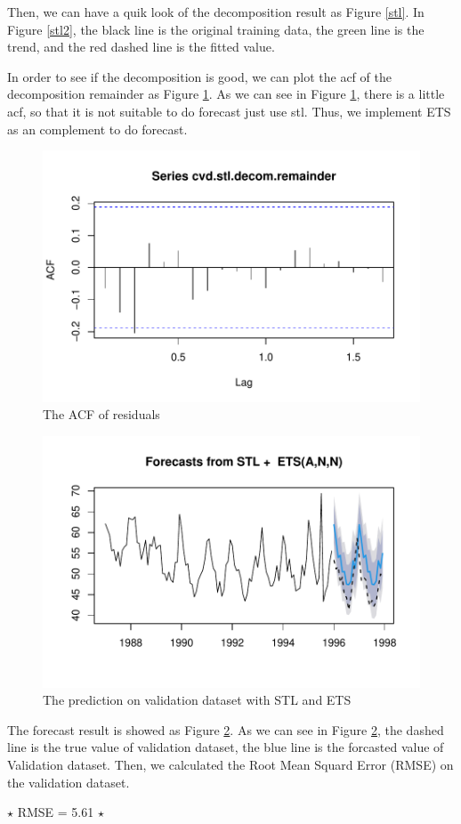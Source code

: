 \documentclass{article}
\begin{document}
Then, we can have a quik look of the decomposition result as Figure \ref{stl}. In Figure \ref{stl2}, the black line is the original training data, the green line is the trend, and the red dashed line is the fitted value.


In order to see if the decomposition is good, we can plot the acf of the decomposition remainder as Figure \ref{stl-acf}. As we can see in Figure \ref{stl-acf}, there is a little acf, so that it is not suitable to do forecast just use stl. 
Thus, we implement ETS as an complement to do forecast. 
\begin{figure}[htbp]
    \centering
    \includegraphics[width=0.58\linewidth]{images/cvd-stl-acf}
    \caption{The ACF of residuals}
    \label{stl-acf}
\end{figure}

\begin{figure}[htbp]
    \centering
    \includegraphics[width=0.6\linewidth]{images/cvs-stl-forecast}
    \caption{The prediction on validation dataset with STL and ETS}
    \label{stl-forecast}
\end{figure}

The forecast result is showed as Figure \ref{stl-forecast}. As we can see in Figure \ref{stl-forecast}, the dashed line is the true 
value of validation dataset, the blue line is the forcasted value of Validation dataset. Then, we calculated the Root Mean Squard Error (RMSE) on the validation dataset. 

$\star$ RMSE = 5.61 $\star$
\end{document}
